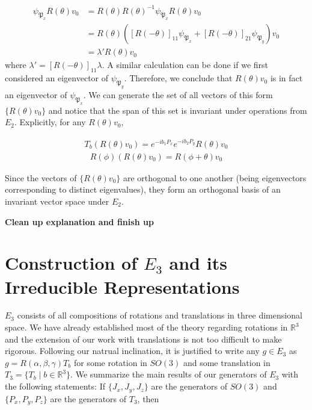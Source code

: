 \documentclass[10pt]{ucthesis}
\newcommand{\R}{\mathbb{R}}
\begin{document}
\begin{equation}
\begin{aligned}
	\psi_{\mathfrak{P}_x} R(\theta)v_0 &= R(\theta)R(\theta)^{-1}\psi_{\mathfrak{P}_x} R(\theta)v_0 \\
									&= R(\theta)([R(-\theta)]_{11}\psi_{\mathfrak{P}_x} + [R(-\theta)]_{21}\psi_{\mathfrak{P}_y} )v_0 \\
									&= \lambda' R(\theta) v_0
\end{aligned}
\end{equation}
where $\lambda'=[R(-\theta)]_{11}\lambda$. A similar calculation can be done if we first considered an eigenvector of $\psi_{\mathfrak{P}_y}$. Therefore, we conclude that $R(\theta)v_0$ is in fact an eigenvector of $\psi_{\mathfrak{P}_x}$. We can generate the set of all vectors of this form $\{R(\theta)v_0\}$ and notice that the span of this set is invariant under operations from $E_2$. Explicitly, for any $R(\theta)v_0$,

\begin{equation}
\begin{aligned}
	T_b(R(\theta)v_0) = e^{-ib_1P_x}e^{-ib_2P_y}R(\theta)v_0
\end{aligned}
\end{equation}
\begin{equation}
\begin{aligned}
	R(\phi)(R(\theta)v_0) = R(\phi+\theta)v_0
\end{aligned}
\end{equation}

Since the vectors of $\{R(\theta)v_0\}$ are orthogonal to one another (being eigenvectors corresponding to distinct eigenvalues), they form an orthogonal basis of an invariant vector space under $E_2$.
 

\textbf{Clean up explanation and finish up}





\newpage

\section{Construction of $E_3$ and its Irreducible Representations}

$E_3$ consists of all compositions of rotations and translations in three dimensional space. We have already established most of the theory regarding rotations in $\R^3$ and the extension of our work with translations is not too difficult to make rigorous. Following our natrual inclination, it is justified to write any $g\in E_3$ as  $g = R(\alpha,\beta,\gamma)T_b$ for some rotation in $SO(3)$ and some translation in $T_3 = \{T_b \mid b\in\R^3\}$. We summarize the main results of our generators of $E_3$ with the following statements: If $\{J_x,J_y,J_z\}$ are the generators of $SO(3)$ and $\{P_x,P_y,P_z\}$ are the generators of $T_3$, then
\end{document}
